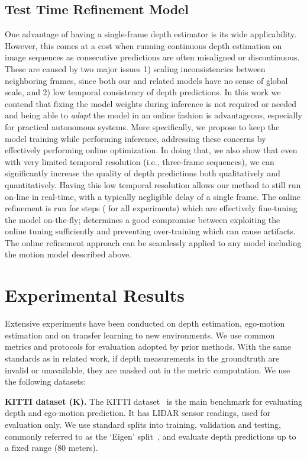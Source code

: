 \documentclass[letterpaper]{article} \usepackage{aaai19}  \usepackage{times}  \usepackage{helvet}  \usepackage{courier}  \usepackage{url}  \usepackage{graphicx}  \frenchspacing
\begin{document}
\subsection{Test Time Refinement Model}
One advantage of having a single-frame depth estimator is its wide applicability. However, this comes at a cost when running continuous depth estimation on image sequences as consecutive predictions are often misaligned or discontinuous. These are caused by two major issues 1) scaling inconsistencies between neighboring frames, since both our and related models have no sense of global scale, and 2) low temporal consistency of depth predictions.
In this work we contend that fixing the model weights during inference is not required or needed and being able to {\it adapt} the model in an online fashion is advantageous, especially for practical autonomous systems.
More specifically, we propose to keep the model training while performing inference, addressing these concerns by effectively performing online optimization. In doing that, we also show that even with very limited temporal resolution (i.e., three-frame sequences), we can significantly increase the quality of depth predictions both qualitatively and quantitatively. Having this low temporal resolution allows our method to still run on-line in real-time, with a typically negligible delay of a single frame.
The online refinement is run for  steps ( for all experiments) which are effectively fine-tuning the model on-the-fly;  determines a good compromise between exploiting the online tuning sufficiently and preventing over-training which can cause artifacts. The online refinement approach can be seamlessly applied to any model including the motion model described above.

\section{Experimental Results}
Extensive experiments have been conducted on  depth estimation, ego-motion estimation and on transfer learning to new environments. We use common metrics and protocols for evaluation adopted by prior methods. With the same standards as in related work, if depth measurements in the groundtruth are invalid or unavailable, they are masked out in the metric computation. We use the following datasets:

\textbf{KITTI dataset (K).} The KITTI dataset~\cite{geiger2013vision} is the main benchmark for evaluating depth and ego-motion prediction. It has LIDAR sensor readings, used for evaluation only. We use standard splits into training, validation and testing, commonly referred to as the `Eigen' split~\cite{eigen2014depth}, and evaluate depth predictions up to a fixed range (80 meters).
\end{document}
